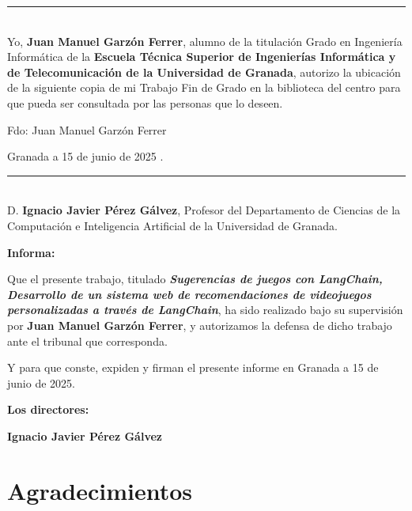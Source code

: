 \newpage


\noindent\rule[-1ex]{\textwidth}{2pt}\\[4.5ex]

Yo, \textbf{Juan Manuel Garzón Ferrer}, alumno de la titulación Grado en Ingeniería Informática de la \textbf{Escuela Técnica Superior
de Ingenierías Informática y de Telecomunicación de la Universidad de Granada}, autorizo la
ubicación de la siguiente copia de mi Trabajo Fin de Grado en la biblioteca del centro para que pueda ser
consultada por las personas que lo deseen.

\vspace{6cm}

\noindent Fdo: Juan Manuel Garzón Ferrer

\vspace{2cm}

\begin{flushright}
Granada a 15 de junio de 2025 .
\end{flushright}


\newpage

\noindent\rule[-1ex]{\textwidth}{2pt}\\[4.5ex]

D. \textbf{Ignacio Javier Pérez Gálvez}, Profesor del Departamento de Ciencias de la Computación e Inteligencia Artificial de la Universidad de Granada.



\textbf{Informa:}


Que el presente trabajo, titulado \textit{\textbf{Sugerencias de juegos con LangChain, Desarrollo de un sistema web de recomendaciones de videojuegos personalizadas a través de LangChain}}, ha sido realizado bajo su supervisión por \textbf{Juan Manuel Garzón Ferrer}, y autorizamos la defensa de dicho trabajo ante el tribunal que corresponda.

\vspace{0.5cm}

Y para que conste, expiden y firman el presente informe en Granada a 15 de junio de 2025.

\vspace{1cm}

\textbf{Los directores:}

\vspace{1cm}

\noindent \textbf{Ignacio Javier Pérez Gálvez}

\chapter*{Agradecimientos}

